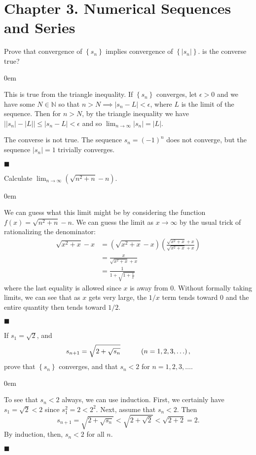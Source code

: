 \documentclass[12pt]{article}
\renewcommand{\qed}{\hfill$\blacksquare$}
\renewenvironment{proof}{\begin{addmargin}[1em]{0em}\begin{newproof}}{\end{newproof}\end{addmargin}\qed}
\newenvironment{problem}[2][Exercise]{\begin{trivlist}
\item[\hskip \labelsep {\bfseries #1}\hskip \labelsep {\bfseries #2.}]}{\end{trivlist}}
\begin{document}
\newpage
\section*{Chapter 3. Numerical Sequences and Series}

\begin{problem}{3.1}
Prove that convergence of $\left\{s_n\right\}$ implies convergence of $\left\{\left|s_n\right|\right\}$. is the converse true?
\end{problem}
\begin{proof}
This is true from the triangle inequality. If $\left\{s_n\right\}$ converges, let $\epsilon>0$ and we have some $N\in \mathbb{N}$ so that $n>N \implies \left| s_n - L\right|<\epsilon$, where $L$ is the limit of the sequence. Then for $n>N$, by the triangle inequality we have $\left|\left|s_n\right|-\left|L\right|\right| \leq \left|s_n-L\right| < \epsilon$ and so $\lim_{n\rightarrow \infty} \left|s_n\right| = \left|L\right|$.

The converse is not true. The sequence $s_n = \left(-1\right)^n$ does not converge, but the sequence $\left|s_n\right|=1$ trivially converges.
\end{proof}


\begin{problem}{3.2}
Calculate $\lim_{n\rightarrow \infty} \left(\sqrt{n^2+n}-n\right)$.
\end{problem}
\begin{proof}
We can guess what this limit might be by considering the function $f\left(x\right) = \sqrt{n^2+n}-n$. We can guess the limit as $x\rightarrow \infty$ by the usual trick of rationalizing the denominator:
\begin{equation*}
\begin{split}
\sqrt{x^2+x}-x & = \left( \sqrt{x^2+x}-x\right)\left( \frac{\sqrt{x^2+x}+x}{\sqrt{x^2+x}+x}\right) \\
& = \frac{x}{\sqrt{x^2+x}+x} \\
& = \frac{1}{1+\sqrt{1+\frac{1}{x} }}
\end{split}
\end{equation*}
where the last equality is allowed since $x$ is away from $0$. Without formally taking limits, we can see that as $x$ gets very large, the $1/x$ term tends toward $0$ and the entire quantity then tends toward $1/2$.
\end{proof}


\begin{problem}{3.3}
If $s_1=\sqrt{2}$, and $$s_{n+1}=\sqrt{2+\sqrt{s_n}} \hspace{10mm} \left(n=1,2,3,\ldots\right), $$ prove that $\left\{s_n\right\}$ converges, and that $s_n < 2$ for $n=1,2,3,\ldots$.
\end{problem}
\begin{proof}

To see that $s_n < 2$ always, we can use induction. First, we certainly have $s_1 = \sqrt{2} < 2$ since $s_1^2 = 2 < 2^2$. Next, assume that $s_n < 2$. Then $$s_{n+1} = \sqrt{2 + \sqrt{s_n}} < \sqrt{2 + \sqrt{2}} < \sqrt{2+2} = 2 .$$ By induction, then, $s_n < 2$ for all $n$.
\end{proof}
\end{document}

